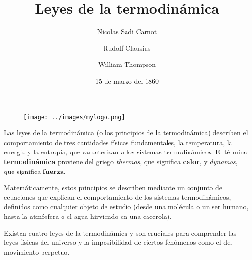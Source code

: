 \documentclass{article}
\begin{document}
	\begin{figure}[!t]
		\centering
		\texttt{[image: ../images/mylogo.png]}
	\end{figure}
	\title{Leyes de la termodin\'amica}
	\author{Nicolas Sadi Carnot \and Rudolf Clausius \and William Thompson}
	\date{15 de marzo del 1860}
	\maketitle
	Las leyes de la termodin\'amica (o los principios de la termodin\'amica) describen el 
	comportamiento de tres cantidades f\'isicas fundamentales, la temperatura, la energ\'ia 
	y la entrop\'ia, que caracterizan a los sistemas termodin\'amicos. El t\'ermino 
	\textbf{termodin\'amica} proviene del griego \textit{thermos}, que significa \textbf{calor}, y \textit{dynamos}, 
	que significa \textbf{fuerza}.\newline
  
	Matem\'aticamente, estos principios se describen mediante un conjunto de ecuaciones que 
	explican el comportamiento de los sistemas termodin\'amicos, definidos como cualquier objeto 
	de estudio (desde una mol\'ecula o un ser humano, hasta la atm\'osfera o el agua hirviendo en 
	una cacerola).\newline
  
	Existen cuatro leyes de la termodin\'amica y son cruciales para comprender las leyes f\'isicas 
	del universo y la imposibilidad de ciertos fen\'omenos como el del movimiento perpetuo.
\end{document}
